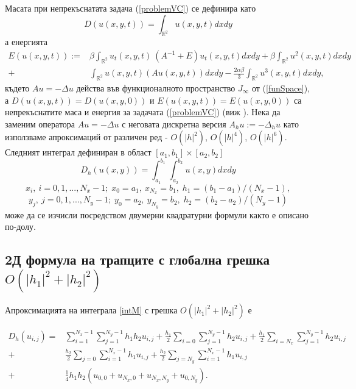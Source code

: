 \documentclass{article}
\newcommand{\rf}[1]{(\ref{#1})}
\newcommand{\RR}{\mathbb{R}}
\begin{document}
Масата при непрекъснатата задача \rf{problemVC} се дефинира като
\begin{equation}\label{intM}
D(u(x,y,t))=\int_{\RR^2} u(x,y,t)dx dy
\end{equation}
а енергията 
\begin{align}\label{ex-en}
E(u(x,y,t)):=&\beta \int_{\RR^2} u_t(x,y,t) \: \left(A^{-1}+E\right)u_t(x,y,t) dxdy+
\beta \int_{\RR^2} u^2(x,y,t) dxdy \nonumber\\
+& \int_{\RR^2}u(x,y,t) \left(A u(x,y,t)\right) dxdy
-\frac{2 \alpha \beta}{3} \int_{\RR^2} u^3(x,y,t) dxdy,
\end{align}
където $Au=-\Delta u$ действа във функционалното пространство $J_\infty$ от \rf{funSpace}, а $D(u(x,y,t)) = D(u(x,y,0))$ и $E(u(x,y,t)) = E(u(x,y,0))$ са непрекъснатите маса и енергия за задачата \rf{problemVC} (виж \cite{ref1}). Нека да заменим оператора $Au=-\Delta u$ с неговата дискретна версия $A_hu :=-\Delta_h u$ като използваме апроксимаций от различен ред - $O(|h|^2)$, $O(|h|^4)$, $O(|h|^6)$.
Следният интеграл дефиниран в област $[a_1, b_1] \times [a_2, b_2]$
\begin{equation}\label{int}
D_h(u(x,y))=\int_{a_1}^{b_1} \int_{a_2}^{b_2} u(x,y)dx dy
\end{equation}
$$x_i, ~i=0,1,...,N_x-1; \;x_0=a_1,~x_{N_x}=b_1, \;h_1=(b_1-a_1)/(N_x-1),$$
$$y_j, ~j=0,1,...,N_y-1; \; y_0=a_2,~y_{N_y}=b_2, \;h_2=(b_2-a_2)/(N_y-1)$$
може да се изчисли посредством двумерни квадратурни формули както е описано по-долу.

\subsection{ 2Д формула на трапците с глобална грешка $O(|h_1|^2+|h_2|^2)$ }

Апроксимацията на интеграла \eqref{intM} с грешка $O(|h_1|^2+|h_2|^2)$ е

\begin{align}\label{quadr2}
D_h(u_{i,j}) =& \sum_{i=1}^{N_x-1} \sum_{j=1}^{N_y-1} h_1 h_2 u_{i,j}
+\frac{h_1}{2}\sum_{i=0} \sum_{j=1}^{N_y-1} h_2 u_{i,j}
+\frac{h_1}{2}\sum_{i=N_x} \sum_{j=1}^{N_y-1} h_2 u_{i,j} \nonumber\\
+&\frac{h_2}{2}\sum_{j=0} \sum_{i=1}^{N_x-1} h_1 u_{i,j}
+\frac{h_2}{2}\sum_{j=N_y} \sum_{i=1}^{N_x-1} h_1 u_{i,j}
\nonumber\\
+&\frac{1}{4}h_1 h_2 \left(u_{0,0}+u_{N_x,0}+u_{N_x,N_y}+u_{0,N_y}
\right).
\end{align}
\end{document}
